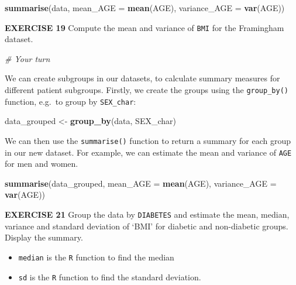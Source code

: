 \documentclass[
]{article}
\newenvironment{Shaded}{\begin{snugshade}}{\end{snugshade}}
\newcommand{\CommentTok}[1]{\textcolor[rgb]{0.56,0.35,0.01}{\textit{#1}}}
\newcommand{\DataTypeTok}[1]{\textcolor[rgb]{0.13,0.29,0.53}{#1}}
\newcommand{\KeywordTok}[1]{\textcolor[rgb]{0.13,0.29,0.53}{\textbf{#1}}}
\newcommand{\NormalTok}[1]{#1}
\newcommand{\StringTok}[1]{\textcolor[rgb]{0.31,0.60,0.02}{#1}}
\providecommand{\tightlist}{%
  \setlength{\itemsep}{0pt}\setlength{\parskip}{0pt}}
\begin{document}
\begin{Shaded}
\begin{Highlighting}[]
\KeywordTok{summarise}\NormalTok{(data, }\DataTypeTok{mean_AGE =} \KeywordTok{mean}\NormalTok{(AGE), }\DataTypeTok{variance_AGE =} \KeywordTok{var}\NormalTok{(AGE))}
\end{Highlighting}
\end{Shaded}

\textbf{EXERCISE 19} Compute the mean and variance of \texttt{BMI} for
the Framingham dataset.

\begin{Shaded}
\begin{Highlighting}[]
\CommentTok{# Your turn}
\end{Highlighting}
\end{Shaded}

We can create subgroups in our datasets, to calculate summary measures
for different patient subgroups. Firstly, we create the groups using the
\texttt{group\_by()} function, e.g.~to group by \texttt{SEX\_char}:

\begin{Shaded}
\begin{Highlighting}[]
\NormalTok{data_grouped <-}\StringTok{ }\KeywordTok{group_by}\NormalTok{(data, SEX_char)}
\end{Highlighting}
\end{Shaded}

We can then use the \texttt{summarise()} function to return a summary
for each group in our new dataset. For example, we can estimate the mean
and variance of \texttt{AGE} for men and women.

\begin{Shaded}
\begin{Highlighting}[]
\KeywordTok{summarise}\NormalTok{(data_grouped, }\DataTypeTok{mean_AGE =} \KeywordTok{mean}\NormalTok{(AGE), }\DataTypeTok{variance_AGE =} \KeywordTok{var}\NormalTok{(AGE))}
\end{Highlighting}
\end{Shaded}

\textbf{EXERCISE 21} Group the data by \texttt{DIABETES} and estimate
the mean, median, variance and standard deviation of `BMI' for diabetic
and non-diabetic groups. Display the summary.

\begin{itemize}
\tightlist
\item
  \texttt{median} is the \texttt{R} function to find the median
\item
  \texttt{sd} is the \texttt{R} function to find the standard deviation.
\end{itemize}
\end{document}
